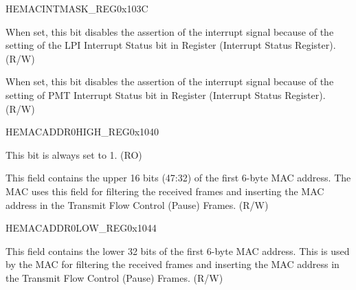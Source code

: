 \begin{register}{H}{EMACINTMASK\_REG}{0x103C}\label{regdesc:EMACINTMASKREG}
%
%
%
%
%
%
\regnewline%
\begin{regdesc}\begin{reglist}
\item [LPIINTMASK]When set, this bit disables the assertion of the interrupt signal because of the setting of the LPI Interrupt Status bit in Register (Interrupt Status  Register).  (R/W)
\item [PMTINTMASK]When set, this bit disables the assertion of the interrupt signal because of the setting of PMT Interrupt Status bit in Register (Interrupt Status  Register). (R/W)
\end{reglist}\end{regdesc}
\end{register}


\begin{register}{H}{EMACADDR0HIGH\_REG}{0x1040}\label{regdesc:EMACADDR0HIGHREG}
%
%
%
\regnewline%
\begin{regdesc}\begin{reglist}
\item [ADDRESS\_ENABLE0]This bit is always set to 1. (RO)
\item [MAC\_ADDRESS0\_HI]This field contains the upper 16 bits (47:32) of the first 6-byte MAC address. The MAC uses this field for filtering the received frames and inserting the MAC address in the Transmit Flow Control (Pause) Frames. (R/W)
\end{reglist}\end{regdesc}
\end{register}


\begin{register}{H}{EMACADDR0LOW\_REG}{0x1044}\label{regdesc:EMACADDR0LOWREG}
%
\regnewline%
\begin{regdesc}\begin{reglist}
\item [EMACADDR0LOW\_REG]This field contains the lower 32 bits of the first 6-byte MAC address. This is used by the MAC for filtering the received frames and inserting the MAC address in the Transmit Flow Control (Pause) Frames. (R/W)
\end{reglist}\end{regdesc}
\end{register}



